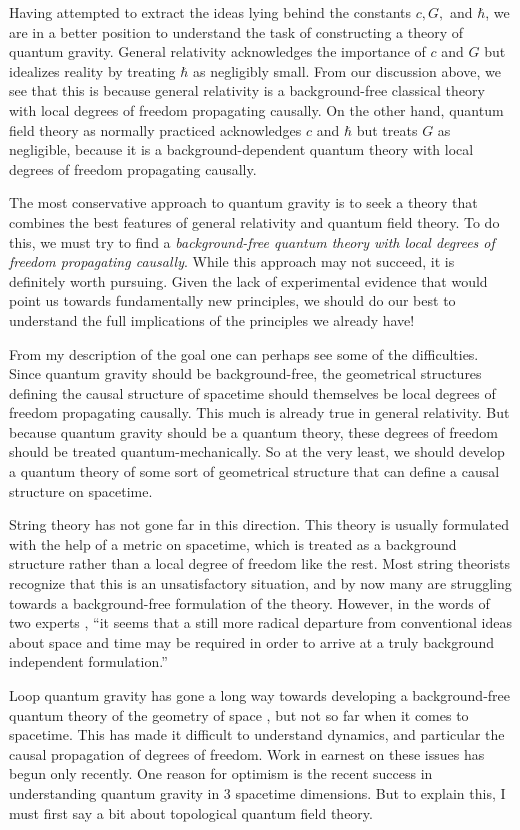 \documentclass[12pt,amsfonts]{article}
\begin{document}
Having attempted to extract the ideas lying behind the constants $c,G,$
and $\hbar$, we are in a better position to understand the task of
constructing a theory of quantum gravity.  General relativity
acknowledges the importance of $c$ and $G$ but idealizes reality by
treating $\hbar$ as negligibly small.  From our discussion above, we see
that this is because general relativity is a background-free
classical theory with local degrees of freedom propagating causally.
On the other hand, quantum field theory as normally practiced
acknowledges $c$ and $\hbar$ but treats $G$ as negligible, because it is
a background-dependent quantum theory with local degrees of freedom
propagating causally.

The most conservative approach to quantum gravity is to seek a theory
that combines the best features of general relativity and quantum field
theory.    To do this, we must try to find a {\it background-free
quantum theory with local degrees of freedom propagating causally}.  
While this approach may not succeed, it is definitely worth pursuing.
Given the lack of experimental evidence that would point us towards 
fundamentally new principles, we should do our best to understand
the full implications of the principles we already have!

From my description of the goal one can perhaps see some of the
difficulties.  Since quantum gravity should be background-free, the
geometrical structures defining the causal structure of spacetime should
themselves be local degrees of freedom propagating causally.  This much
is already true in general relativity.  But because quantum gravity
should be a quantum theory, these degrees of freedom should be treated
quantum-mechanically.  So at the very least, we should develop a quantum
theory of some sort of geometrical structure that can define a causal
structure on spacetime.   

String theory has not gone far in this direction.  This  theory is
usually formulated with the help of a metric on spacetime, which is
treated as a background structure rather than a local degree of freedom
like the rest.   Most string theorists recognize that this is an
unsatisfactory situation, and by now many are struggling towards a
background-free formulation of the theory.   However, in the words of
two experts \cite{HN}, ``it seems that a still more radical departure
from conventional ideas about space and time may be required in order to
arrive at a truly background independent formulation.''

Loop quantum gravity has gone a long way towards developing a
background-free quantum theory of the geometry of space
\cite{Ashtekar,Rovelli4}, but not so far when it comes to spacetime. 
This has made it difficult to understand dynamics, and particular the
causal propagation of degrees of freedom.  Work in earnest on these
issues has begun only recently.  One reason for optimism is the recent
success in understanding quantum gravity in 3 spacetime dimensions.  
But to explain this, I must first say a bit about topological quantum
field theory.  
\end{document}
